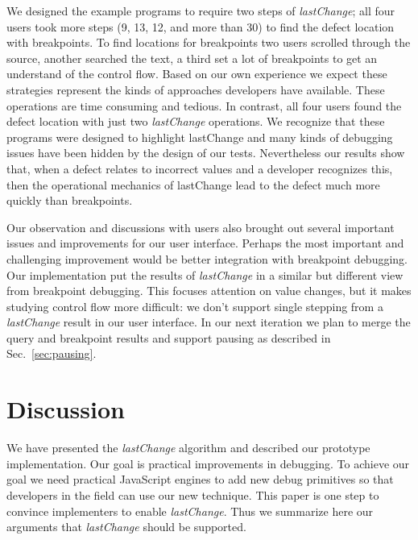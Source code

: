 \documentclass{sig-alternate}
\begin{document}
We designed the example programs to require two steps of \textit{lastChange}; 
all four users took more steps (9, 13, 12, and more than 30) to find the defect location with breakpoints.  
To find locations for breakpoints two users scrolled through the source, 
another searched the text, a third set a lot of breakpoints to get an understand of the control flow. 
Based on our own experience we expect these strategies represent the kinds of approaches 
developers have available. These operations are time consuming and tedious. In contrast, all four users 
found the defect location with just two \textit{lastChange} operations.
We recognize that these programs were designed to highlight lastChange and many kinds of debugging 
issues have been hidden by the design of our tests. Nevertheless our results show that, when a defect 
relates to incorrect values and a developer recognizes this, then the operational 
mechanics of lastChange lead to the defect much more quickly than breakpoints.

Our observation and discussions with users also brought out several important issues and improvements
for our user interface. Perhaps the most important and challenging improvement would be better integration 
with breakpoint debugging. Our implementation put the results of \textit{lastChange} in a similar but different
view from breakpoint debugging. This focuses attention on value changes, but it makes studying control 
flow more difficult: we don't support single stepping from a \textit{lastChange} result in our user interface. In our next iteration we 
plan to merge the query and breakpoint results and support pausing as described in Sec.~\ref{sec:pausing}.

\section{Discussion}

We have presented the \textit{lastChange} algorithm and described our
prototype implementation. Our goal is practical improvements in debugging. To achieve our goal we need practical JavaScript engines
to add new debug primitives so that developers in the field can use our new technique. This paper is
one step to convince implementers to enable \textit{lastChange}.
Thus we summarize here our arguments that \textit{lastChange} should be supported.
\end{document}
